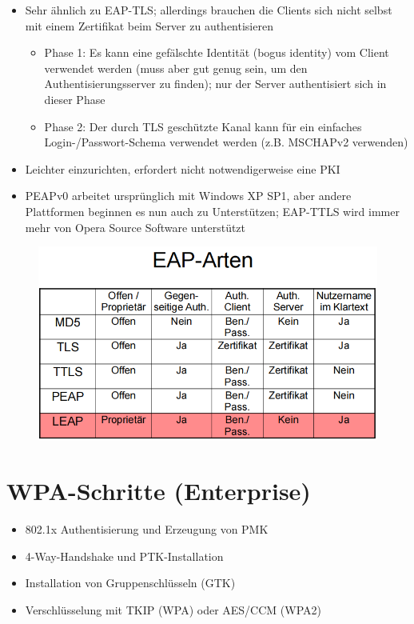 \documentclass[openany]{book}
\begin{document}
\begin{itemize}
    \item Sehr ähnlich zu EAP-TLS; allerdings brauchen die Clients sich nicht selbst mit einem Zertifikat beim Server zu authentisieren
    \begin{itemize}
        \item Phase 1: Es kann eine gefälschte Identität (bogus identity) vom Client verwendet werden (muss aber gut genug sein, um den Authentisierungsserver zu finden); nur der Server authentisiert sich in dieser Phase
        \item Phase 2: Der durch TLS geschützte Kanal kann für ein einfaches Login-/Passwort-Schema verwendet werden (z.B. MSCHAPv2 verwenden)
    \end{itemize}
    \item Leichter einzurichten, erfordert nicht notwendigerweise eine PKI
    \item PEAPv0 arbeitet ursprünglich mit Windows XP SP1, aber andere Plattformen beginnen es nun auch zu Unterstützen; EAP-TTLS wird immer mehr von Opera Source Software unterstützt
\end{itemize}

\newpage

\begin{figure}[h!]
    \centering
    \includegraphics[width=0.85\linewidth]{Pics/EAP.PNG}
\end{figure}

\section{WPA-Schritte (Enterprise)}

\begin{itemize}
    \item 802.1x Authentisierung und Erzeugung von PMK
    \item 4-Way-Handshake und PTK-Installation
    \item Installation von Gruppenschlüsseln (GTK)
    \item Verschlüsselung mit TKIP (WPA) oder AES/CCM (WPA2)
\end{itemize}
\end{document}
